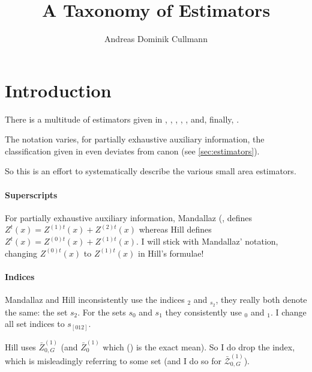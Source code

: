 \documentclass[a4paper]{article}
\title{A Taxonomy of Estimators}
\author{Andreas Dominik Cullmann}
\begin{document}
\maketitle
\providecommand{\analogy}{--}
\providecommand{\rpack}[1]{package \texttt{#1}}
\providecommand{\rdata}[1]{\texttt{#1}}
\providecommand{\rcode}[1]{\texttt{#1}}
\providecommand{\eZ}{\mathcal{Z}}
\providecommand{\strongrule}{\midrule[2pt]}
\providecommand{\lightrule}{\midrule[0.4pt]}
\providecommand{\vR}{\frac{1}{n_{s_2,G}}\hat{V}(\hat{R}_{s_2,G}(x))}
\providecommand{\mR}{\bar{\hat{R}}_{s_2,G}(x)}
\providecommand{\vRc}{\frac{1}{n_{s_2,G}}\hat{V}(\hat{R}_{c,s_2,G}(x))}
\providecommand{\mRc}{\bar{\hat{R}}_{c,s_2,G}(x)}
\section{Introduction}


There is a multitude of estimators given in \cite{Man12a.e},
\cite{Man13a},
\cite{Man13b.e},
\cite{Man13b},
\cite{Man13c.e},
\cite{Man13c} and, finally, 
\cite{hill2017}.

The notation varies, for partially exhaustive auxiliary information, 
the classification given in \cite{hill2017}
even deviates from canon (see \ref{sec:estimators}).

So this is an effort to systematically describe the various small area
estimators.

\paragraph{Superscripts}
For partially exhaustive auxiliary information, 
Mandallaz (\cite[p.~1023]{Man13b}, \cite[p.~383f]{Man13c} defines 
$Z^t(x) = Z^{(1)t}(x)+Z^{(2)t}(x)$ 
whereas Hill \cite[p.~4 and p.~18]{hill2017} defines 
$Z^t(x) = Z^{(0)t}(x)+Z^{(1)t}(x)$.
I will stick with Mandallaz' notation, changing $Z^{(0)t}(x)$ to $Z^{(1)t}(x)$
in Hill's formulae!

\paragraph{Indices}
Mandallaz and Hill inconsistently use the indices $_2$ and $_{s_2}$,
they really both denote the same: the set
$s_2$.
For the sets $s_0$ and $s_1$ they consistently use $_0$ and $_1$.
I change all set indices to $s_{[012]}$.



Hill uses $\bar{Z}_{0,G}^{(1)}$ (and $\bar{Z}_{0}^{(1)}$ which
(\cite[p.~18]{hill2017}) is the exact mean). So I do drop the index,
which is misleadingly referring to some set (and I do so for
$\bar{\eZ}_{0,G}^{(1)}$).
\end{document}
